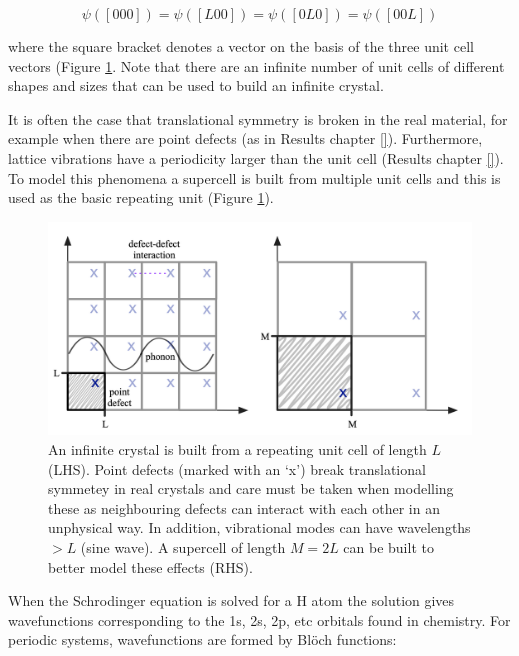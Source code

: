 \begin{equation}
\psi([0 0 0]) = \psi([L 0 0]) =  \psi([ 0 L 0]) = \psi([0 0 L])
\end{equation}

where the square bracket denotes a vector on the basis of the three unit cell vectors (Figure \ref{translational}. Note that there are an infinite number of unit cells of different shapes and sizes that can be used to build an infinite crystal.

It is often the case that translational symmetry is broken in the real material, for example when there are point defects (as in Results chapter \ref{}). Furthermore, lattice vibrations have a periodicity larger than the unit cell (Results chapter \ref{}). To model this phenomena a supercell is built from multiple unit cells and this is used as the basic repeating unit (Figure \ref{translational}).

\begin{figure}[h]
\centering
  \includegraphics[width=1.0\columnwidth]{figures/ch3/supercell.png}
  \caption[Translational symmetry and supercell construction]{An infinite crystal is built from a repeating unit cell of length $L$ (LHS). Point defects (marked with an `x') break translational symmetey in real crystals and care must be taken when modelling these as neighbouring defects can interact with each other in an unphysical way. In addition, vibrational modes can have wavelengths $>L$ (sine wave). A supercell of length $M=2L$ can be built to better model these effects (RHS). } 
  \label{translational}
\end{figure}

When the Schrodinger equation is solved for a H atom the solution gives wavefunctions corresponding to the 1s, 2s, 2p, etc orbitals found in chemistry. For periodic systems, wavefunctions are formed by Bl\"{o}ch functions:\autocite{Hoffman1987}

